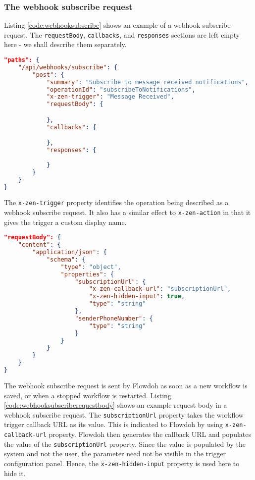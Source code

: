 \subsubsection{The webhook subscribe request}
Listing \ref{code:webhooksubscribe} shows an example of a webhook subscribe request. The \texttt{requestBody}, \texttt{callbacks}, and \texttt{responses} sections are left empty here - we shall describe them separately.\\
\begin{minipage}{\textwidth}
\begin{lstlisting}[caption={Webhook subscribe request},label={code:webhooksubscribe},language=json]
"paths": {
    "/api/webhooks/subscribe": {
        "post": {
            "summary": "Subscribe to message received notifications",
            "operationId": "subscribeToNotifications",
            "x-zen-trigger": "Message Received",
            "requestBody": {

            },
            "callbacks": {

            },
            "responses": {
                
            }
        }
    }
}
\end{lstlisting}
\end{minipage}
The \texttt{x-zen-trigger} property identifies the operation being described as a webhook subscribe request. It also has a similar effect to \texttt{x-zen-action} in that it gives the trigger a custom display name.
\begin{minipage}{\textwidth}
\begin{lstlisting}[caption={Webhook subscribe request - the request body},label={code:webhooksubscriberequestbody},language=json]
"requestBody": {
    "content": {
        "application/json": {
            "schema": {
                "type": "object",
                "properties": {
                    "subscriptionUrl": {
                        "x-zen-callback-url": "subscriptionUrl",
                        "x-zen-hidden-input": true,
                        "type": "string"
                    },
                    "senderPhoneNumber": {
                        "type": "string"
                    }
                }
            }
        }
    }
}
\end{lstlisting}
\end{minipage}
The webhook subscribe request is sent by Flowdoh as soon as a new workflow is saved, or when a stopped workflow is restarted.
Listing \ref{code:webhooksubscriberequestbody} shows an example request body in a webhook subscribe request. The \texttt{subscriptionUrl} property takes the workflow trigger callback URL as its value. This is indicated to Flowdoh by using \texttt{x-zen-callback-url} property. Flowdoh then generates the callback URL and populates the value of the \texttt{subscriptionUrl} property. Since the value is populated by the system and not the user, the parameter need not be visible in the trigger configuration panel. Hence, the \texttt{x-zen-hidden-input} property is used here to hide it.\\
